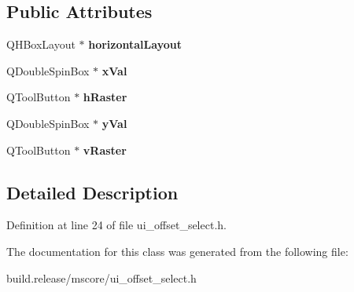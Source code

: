 \subsection*{Public Attributes}
\begin{DoxyCompactItemize}
\item 
\mbox{\label{class_ui___offset_select_a766c7eed129c2985919285b22bf6062f}} 
Q\+H\+Box\+Layout $\ast$ {\bfseries horizontal\+Layout}
\item 
\mbox{\label{class_ui___offset_select_afac8f8c9830a243f2f2c5e49159d6260}} 
Q\+Double\+Spin\+Box $\ast$ {\bfseries x\+Val}
\item 
\mbox{\label{class_ui___offset_select_a898a30efe9d39e35cbacaca3499bd8e7}} 
Q\+Tool\+Button $\ast$ {\bfseries h\+Raster}
\item 
\mbox{\label{class_ui___offset_select_a17e1f3022a5af3731405ba660e33099e}} 
Q\+Double\+Spin\+Box $\ast$ {\bfseries y\+Val}
\item 
\mbox{\label{class_ui___offset_select_ac0749095e88719fb32f3a3c93597bfe8}} 
Q\+Tool\+Button $\ast$ {\bfseries v\+Raster}
\end{DoxyCompactItemize}


\subsection{Detailed Description}


Definition at line 24 of file ui\+\_\+offset\+\_\+select.\+h.



The documentation for this class was generated from the following file\+:\begin{DoxyCompactItemize}
\item 
build.\+release/mscore/ui\+\_\+offset\+\_\+select.\+h\end{DoxyCompactItemize}
